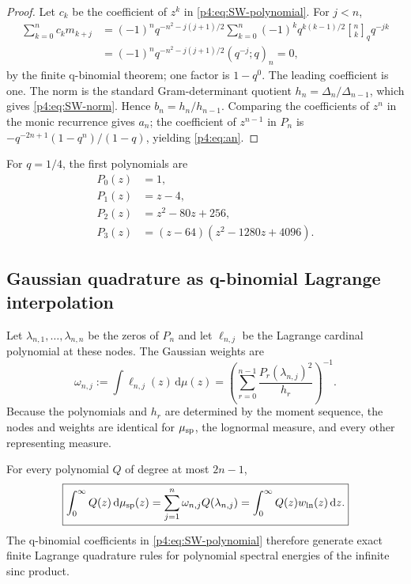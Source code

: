 \documentclass[11pt,oneside]{article}
\theoremstyle{definition}
\theoremstyle{remark}
\newcommand{\dd}{\,\mathrm d}
\newcommand{\qbinom}[3]{\genfrac{[}{]}{0pt}{}{#1}{#2}_{#3}}
\begin{document}
\begin{proof}
Let $c_k$ be the coefficient of $z^k$ in \eqref{p4:eq:SW-polynomial}.  For $j<n$,
\begin{align*}
 \sum_{k=0}^{n}c_km_{k+j}
 &=(-1)^nq^{-n^2-j(j+1)/2}
 \sum_{k=0}^{n}(-1)^kq^{k(k-1)/2}
 \qbinom{n}{k}{q}q^{-jk}\\
 &=(-1)^nq^{-n^2-j(j+1)/2}(q^{-j};q)_n=0,
\end{align*}
by the finite q-binomial theorem; one factor is $1-q^0$.  The leading coefficient is one.
The norm is the standard Gram-determinant quotient
$h_n=\Delta_n/\Delta_{n-1}$, which gives \eqref{p4:eq:SW-norm}.  Hence
$b_n=h_n/h_{n-1}$.  Comparing the coefficients of $z^n$ in the monic recurrence gives
$a_n$; the coefficient of $z^{n-1}$ in $P_n$ is
$-q^{-2n+1}(1-q^n)/(1-q)$, yielding \eqref{p4:eq:an}.
\end{proof}

For $q=1/4$, the first polynomials are
\begin{align}
 P_0(z)&=1,\nonumber\\
 P_1(z)&=z-4,\nonumber\\
 P_2(z)&=z^2-80z+256,\nonumber\\
 P_3(z)&=(z-64)(z^2-1280z+4096).
 \label{p4:eq:first-SW-polynomials}
\end{align}

\subsection{Gaussian quadrature as q-binomial Lagrange interpolation}

Let $\lambda_{n,1},\ldots,\lambda_{n,n}$ be the zeros of $P_n$ and let
$\ell_{n,j}$ be the Lagrange cardinal polynomial at these nodes.  The Gaussian weights are
\begin{equation}
 \omega_{n,j}:=\int\ell_{n,j}(z)\dd\mu(z)
 =\left(\sum_{r=0}^{n-1}\frac{P_r(\lambda_{n,j})^2}{h_r}\right)^{-1}.
 \label{p4:eq:Christoffel-weights}
\end{equation}
Because the polynomials and $h_r$ are determined by the moment sequence, the nodes and
weights are identical for $\mu_{\rm sp}$, the lognormal measure, and every other representing
measure.

\begin{corollary}
\label{p4:cor:Gaussian-quadrature}
For every polynomial $Q$ of degree at most $2n-1$,
\begin{equation}
 \boxed{
 \int_0^\infty Q(z)\dd\mu_{\rm sp}(z)
 =\sum_{j=1}^{n}\omega_{n,j}Q(\lambda_{n,j})
 =\int_0^\infty Q(z)w_{\rm ln}(z)\dd z.}
 \label{p4:eq:Gaussian-quadrature}
\end{equation}
The q-binomial coefficients in \eqref{p4:eq:SW-polynomial} therefore generate exact finite
Lagrange quadrature rules for polynomial spectral energies of the infinite sinc product.
\end{corollary}
\end{document}
